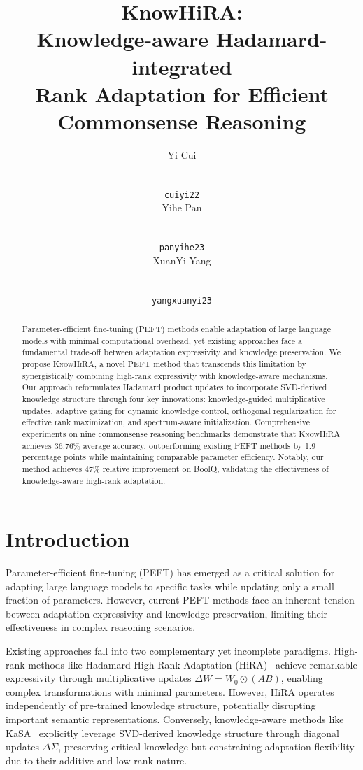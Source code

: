 \documentclass[10pt,letterpaper]{article}
\title{KnowHiRA:\\Knowledge-aware Hadamard-integrated\\Rank Adaptation for Efficient\\Commonsense Reasoning}
\author{
Yi Cui \\
\deptcs{} \\
\fudan{} \\
\texttt{cuiyi22\emaildomain} \\
\And
Yihe Pan \\
\deptds{} \\
\fudan{} \\
\texttt{panyihe23\emaildomain} \\
\And
XuanYi Yang \\
\deptds{} \\
\fudan{} \\
\texttt{yangxuanyi23\emaildomain} \\
}
\begin{document}
\maketitle

\begin{abstract}
Parameter-efficient fine-tuning (PEFT) methods enable adaptation of large language models with minimal computational overhead, yet existing approaches face a fundamental trade-off between adaptation expressivity and knowledge preservation. We propose \textsc{KnowHiRA}, a novel PEFT method that transcends this limitation by synergistically combining high-rank expressivity with knowledge-aware mechanisms. Our approach reformulates Hadamard product updates to incorporate SVD-derived knowledge structure through four key innovations: knowledge-guided multiplicative updates, adaptive gating for dynamic knowledge control, orthogonal regularization for effective rank maximization, and spectrum-aware initialization. Comprehensive experiments on nine commonsense reasoning benchmarks demonstrate that \textsc{KnowHiRA} achieves 36.76\% average accuracy, outperforming existing PEFT methods by 1.9 percentage points while maintaining comparable parameter efficiency. Notably, our method achieves 47\% relative improvement on BoolQ, validating the effectiveness of knowledge-aware high-rank adaptation.
\end{abstract}

\section{Introduction}

Parameter-efficient fine-tuning (PEFT) has emerged as a critical solution for adapting large language models to specific tasks while updating only a small fraction of parameters. However, current PEFT methods face an inherent tension between adaptation expressivity and knowledge preservation, limiting their effectiveness in complex reasoning scenarios.

Existing approaches fall into two complementary yet incomplete paradigms. High-rank methods like Hadamard High-Rank Adaptation (HiRA)~\citep{huang2024hira} achieve remarkable expressivity through multiplicative updates $\Delta W = W_0 \odot (AB)$, enabling complex transformations with minimal parameters. However, HiRA operates independently of pre-trained knowledge structure, potentially disrupting important semantic representations. Conversely, knowledge-aware methods like KaSA~\citep{wang2024kasa} explicitly leverage SVD-derived knowledge structure through diagonal updates $\Delta \Sigma$, preserving critical knowledge but constraining adaptation flexibility due to their additive and low-rank nature.
\end{document}
